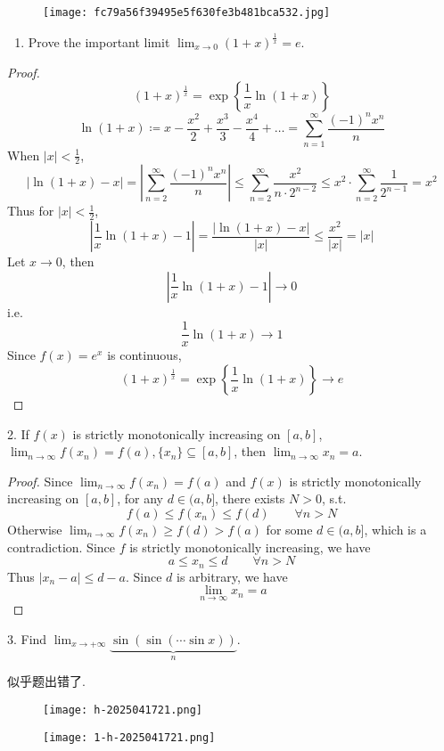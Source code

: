 \begin{figure}[H]
\centering
\texttt{[image: fc79a56f39495e5f630fe3b481bca532.jpg]}
\label{}
\end{figure}

\begin{exercise}
\begin{enumerate}
		\item Prove the important limit $\lim_{x \rightarrow 0}(1+x)^{\frac{1}{x}}=e$.
	\end{enumerate}
\end{exercise}
\begin{proof}
\[
(1+x)^{\frac{1}{x}}=\exp \left\{  \frac{1}{x}\ln(1+x)  \right\}
\]
\[
\ln (1+x)\coloneqq x-\frac{x^2}{2}+\frac{x^{3}}{3}-\frac{x^{4}}{4}+\dots=\sum_{n=1}^{\infty} \frac{(-1)^{n}x^{n}}{n}
\]
When $\lvert x \rvert<\frac{1}{2}$,
\[
\lvert \ln(1+x)-x \rvert =\left\lvert  \sum_{n=2}^{\infty} \frac{(-1)^{n}x^{n}}{n}  \right\rvert \leq \sum_{n=2}^{\infty} \frac{x^2}{n\cdot2^{n-2}}\leq x^2\cdot \sum_{n=2}^{\infty} \frac{1}{2^{n-1}}=x^2
\]
Thus for $\lvert x \rvert<\frac{1}{2}$,
\[
\left\lvert  \frac{1}{x}\ln(1+x)-1  \right\rvert =\frac{\lvert \ln(1+x)-x \rvert }{\lvert x \rvert }\leq \frac{x^2}{\lvert x \rvert }=\lvert x \rvert
\]
Let $x\to0$, then
\[
\left\lvert  \frac{1}{x}\ln(1+x)-1  \right\rvert \to0
\]
i.e.
\[
\frac{1}{x}\ln(1+x)\to1
\]
Since $f(x)=e^{ x }$ is continuous,
\[
(1+x)^{\frac{1}{x}}=\exp \left\{  \frac{1}{x}\ln(1+x)  \right\}\to e
\]
\end{proof}

\begin{exercise}
2. If $f(x)$ is strictly monotonically increasing on $[a, b]$, $\lim_{n \rightarrow \infty} f(x_n)=f(a),\{x_n\} \subseteq[a, b]$, then $\lim_{n \rightarrow \infty} x_n=a$.
\end{exercise}
\begin{proof}
Since $\lim_{ n \to \infty }f(x_n)=f(a)$ and $f(x)$ is strictly monotonically increasing on $[a,b]$, for any $d\in(a,b]$, there exists $N>0$, s.t.
\[
f(a)\leq f(x_n)\leq f(d)\qquad \forall n>N
\]
Otherwise $\lim_{ n \to \infty }f(x_n)\geq f(d)>f(a)$ for some $d\in(a,b]$, which is a contradiction. Since $f$ is strictly monotonically increasing, we have
\[
a\leq x_n\leq d\qquad \forall n>N
\]
Thus $\lvert x_n-a \rvert\leq d-a$. Since $d$ is arbitrary, we have
\[
\lim_{ n \to \infty } x_n=a
\]
\end{proof}

\begin{exercise}
3. Find $\lim_{x \rightarrow+\infty} \underbrace{\sin (\sin (\cdots \sin x))}_n$.
\end{exercise}
似乎题出错了.
\begin{figure}[H]
\centering
\texttt{[image: h-2025041721.png]}
\label{}
\end{figure}
\begin{figure}[H]
\centering
\texttt{[image: 1-h-2025041721.png]}
\label{}
\end{figure}

